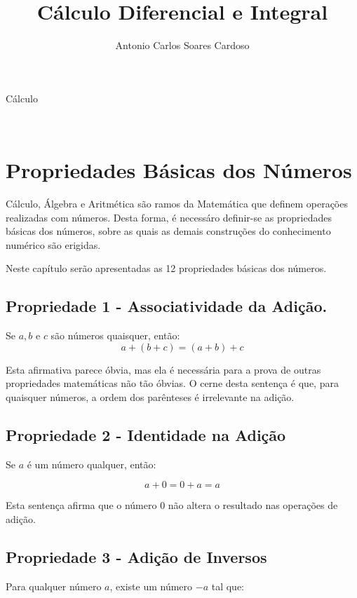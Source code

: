 \documentclass[
    12pt, %
    openright,
    twoside, %
    a4paper, %
    article,
    english,brazil %
]{abntex2}
\author{Antonio Carlos Soares Cardoso}
\title{Cálculo Diferencial e Integral}
\makeatletter
\renewcommand\tableofcontents{%
  \null\hfill\textbf{\Large\contentsname}\hfill\null\par
  \@mkboth{\MakeUppercase\contentsname}{\MakeUppercase\contentsname}%
  \@starttoc{toc}%
}
\makeatother
\begin{document}
\begin{capa}
    \center
    \ABNTEXchapterfont\Large Cálculo\\
    \vspace*{1cm}
    {\ABNTEXchapterfont\large\imprimirautor}
    \vfill
    \begin{center}
    \ABNTEXchapterfont\bfseries\LARGE\imprimirtitulo
    \end{center}
    \vfill
    \large\imprimirlocal \\
    \large\imprimirdata
    \vspace*{1cm}
\end{capa}

\tableofcontents

\newpage

\textual

\section{Propriedades Básicas dos Números}

Cálculo, Álgebra e Aritmética são ramos da Matemática que definem operações realizadas com números. Desta forma, é necessáro definir-se as propriedades básicas dos números, sobre as quais as demais construções do conhecimento numérico são erigidas.

Neste capítulo serão apresentadas as 12 propriedades básicas dos números.

\subsection{Propriedade 1 - Associatividade da Adição.}

Se $a,b$ e $c$ são números quaisquer, então: 
$$ a+(b+c)=(a+b)+c $$

Esta afirmativa parece óbvia, mas ela é necessária para a prova de outras propriedades matemáticas não tão óbvias. O cerne desta sentença é que, para quaisquer números, a ordem dos parênteses é irrelevante na adição. 

\subsection{Propriedade 2 - Identidade na Adição}
Se $a$ é um número qualquer, então: 

$$a+0=0+a=a$$

Esta sentença afirma que o número $0$ não altera o resultado nas operações de adição.

\subsection{Propriedade 3 - Adição de Inversos}
Para qualquer número $a$, existe um número $-a$ tal que: 
\end{document}
